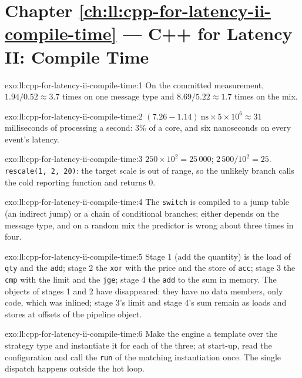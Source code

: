 \section*{Chapter \ref{ch:ll:cpp-for-latency-ii-compile-time} --- C++ for Latency II: Compile Time}

\begin{solution}{exo:ll:cpp-for-latency-ii-compile-time:1}
On the committed measurement, $1.94/0.52 \approx 3.7$ times on one message type and $8.69/5.22 \approx 1.7$ times on the
mix.
\end{solution}

\begin{solution}{exo:ll:cpp-for-latency-ii-compile-time:2}
$(7.26 - 1.14)\ \text{ns} \times 5 \times 10^6 \approx 31$ milliseconds of processing a second: 3\% of a core, and six
nanoseconds on every event's latency.
\end{solution}

\begin{solution}{exo:ll:cpp-for-latency-ii-compile-time:3}
$250 \times 10^2 = 25\,000$; $2\,500 / 10^2 = 25$. \texttt{rescale(1, 2, 20)}: the target scale is out of range, so the
unlikely branch calls the cold reporting function and returns 0.
\end{solution}

\begin{solution}{exo:ll:cpp-for-latency-ii-compile-time:4}
The \texttt{switch} is compiled to a jump table (an indirect jump) or a chain of conditional branches; either depends on the
message type, and on a random mix the predictor is wrong about three times in four.
\end{solution}

\begin{solution}{exo:ll:cpp-for-latency-ii-compile-time:5}
Stage 1 (add the quantity) is the load of \texttt{qty} and the \texttt{add}; stage 2 the \texttt{xor} with the price and the
store of \texttt{acc}; stage 3 the \texttt{cmp} with the limit and the \texttt{jge}; stage 4 the \texttt{add} to the sum in
memory. The objects of stages 1 and 2 have disappeared: they have no data members, only code, which was inlined; stage 3's
limit and stage 4's sum remain as loads and stores at offsets of the pipeline object.
\end{solution}

\begin{solution}{exo:ll:cpp-for-latency-ii-compile-time:6}
Make the engine a template over the strategy type and instantiate it for each of the three; at start-up, read the
configuration and call the \texttt{run} of the matching instantiation once. The single dispatch happens outside the hot
loop.
\end{solution}

